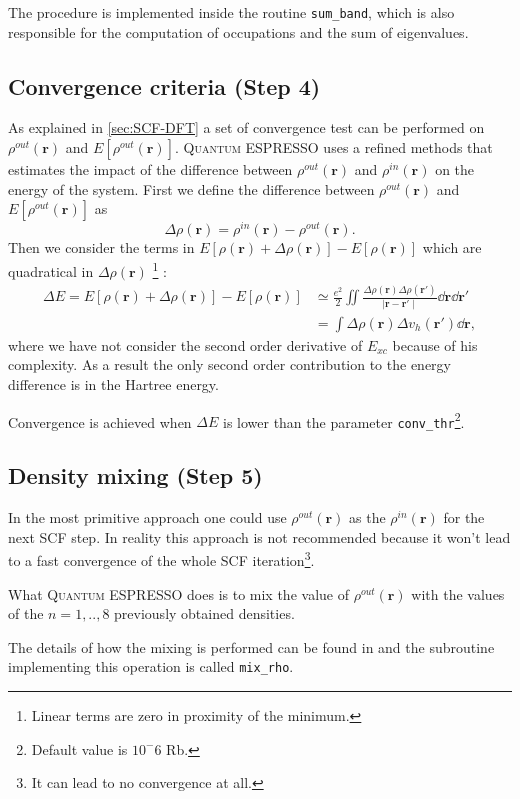 \documentclass[a4paper,12pt]{article}
\newcommand\dens{\rho(\mathbf{r})}
\newcommand\densin{\rho^{in}(\mathbf{r})}
\newcommand\densout{\rho^{out}(\mathbf{r})}
\newcommand\erre{\mathbf{r}}
\newcommand\QE{\textsc{Quantum} ESPRESSO }
\begin{document}
The procedure is implemented inside the routine \texttt{sum\_band}, which is also responsible for the computation of occupations and the sum of eigenvalues.


\subsection{Convergence criteria (Step 4)}
As explained in \ref{sec:SCF-DFT} a set of convergence test can be performed on $\densout$ and $E[\densout]$.
\QE uses a refined methods that estimates the impact of the difference between $\densout$ and $\densin$ on the energy of the system.
First we define the difference between $\densout$ and $E[\densout]$ as 
\begin{equation}
	\Delta\dens = \densin - \densout.
\end{equation}
Then we consider the terms in $E[\dens + \Delta\dens] - E[\dens ]$ which are quadratical in $\Delta\dens$ \footnote{Linear terms are zero in proximity of the minimum.} :
\begin{align}
	\Delta E = E[\dens + \Delta\dens] - E[\dens ] &\simeq \frac{e^2}{2} \iint \frac{\Delta\rho(\erre) \Delta\rho(\erre')}{\mid \erre - \erre' \mid} \dd{\erre} \dd{\erre'}\\
	 &= \int \Delta\dens \Delta v_{h}(\erre') \dd{\erre},
\end{align}
where we have not consider the second order derivative of $E_{xc}$ because of his complexity.
As a result the only second order contribution to the energy difference is in the Hartree energy.

Convergence is achieved when $\Delta E$ is lower than the parameter \texttt{conv\_thr}\footnote{Default value is $10^-6$ Rb.}.

\subsection{Density mixing (Step 5)}
In the most primitive approach one could use $\densout$ as the $\densin$ for the next SCF step. In reality this approach is not recommended because it won't lead to a fast convergence of the whole SCF iteration\footnote{It can lead to no convergence at all.}.

What \QE does is to mix the value of $\densout$ with the values of the $n=1,..,8$ previously obtained densities.

The details of how the mixing is performed can be found in \cite{Johnson} and the subroutine implementing this operation is called \texttt{mix\_rho}.
\end{document}
